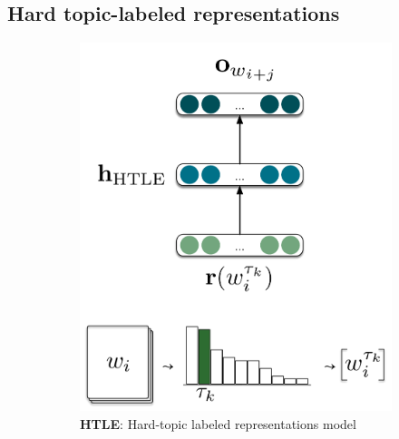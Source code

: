 \subsection{Hard topic-labeled representations}
\label{sect:hardReps}

\begin{figure}[ht!]
\centering
\begin{subfigure}[t]{0.285\textwidth}
\includegraphics[width=\linewidth]{03-research-01/figs/fig1.pdf}
\caption{\textbf{HTLE}: Hard-topic labeled representations model}
\end{subfigure}
\hspace{0.15\textwidth}
\begin{subfigure}[t]{0.315\textwidth}

\end{subfigure}
\end{figure}
